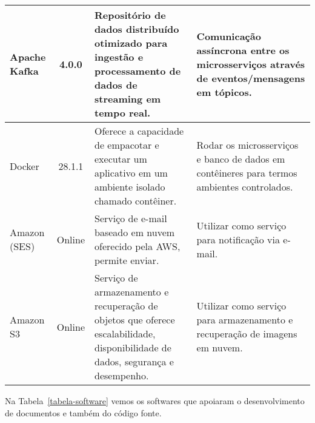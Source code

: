 \begin{footnotesize}
\begin{longtable}{|p{1.8cm}|c|p{5cm}|p{6.3cm}|}
    Apache Kafka & 4.0.0 & Repositório de dados distribuído otimizado para ingestão e processamento de dados de streaming em tempo real. & Comunicação assíncrona entre os microsserviços através de eventos/mensagens em tópicos. \\\hline

    Docker & 28.1.1 & Oferece a capacidade de empacotar e executar um aplicativo em um ambiente isolado chamado contêiner. & Rodar os microsserviços e banco de dados em contêineres para termos ambientes controlados. \\\hline

    Amazon (SES) & Online & Serviço de e-mail baseado em nuvem oferecido pela AWS, permite enviar. & Utilizar como serviço para notificação via e-mail. \\\hline

    Amazon S3 & Online & Serviço de armazenamento e recuperação de objetos que oferece escalabilidade, disponibilidade de dados, segurança e desempenho. & Utilizar como serviço para armazenamento e recuperação de imagens em nuvem. \\\hline
\end{longtable}
\end{footnotesize}







Na Tabela~\ref{tabela-software} vemos os softwares que apoiaram o desenvolvimento de documentos e também do código fonte.

